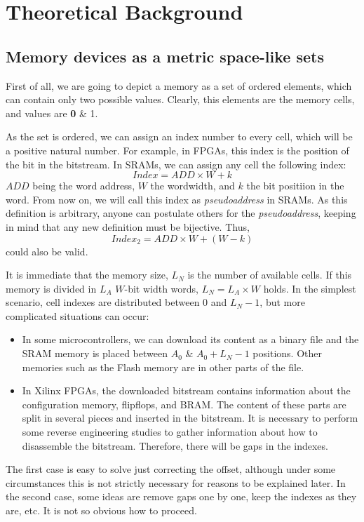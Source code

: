 \chapter{Theoretical Background}
\section{Memory devices as a metric space-like sets}
First of all, we are going to depict a memory as a set of ordered elements, which can contain only two possible values. Clearly, this elements are the memory cells, and values are \textbf{0} \& 1.

As the set is ordered, we can assign an index number to every cell, which will be a positive natural number. For example, in FPGAs, this index is the position of the bit in the bitstream. In SRAMs, we can assign any cell the following index:
%
\begin{equation}
	Index = ADD\times W + k
	\label{Eq:PseudoAddressDefinition}
\end{equation}
%
\(ADD\) being the word address, \(W\) the wordwidth, and \(k\) the bit positiion in the word. From now on, we will call this index as \textit{pseudoaddress} in SRAMs. As this definition is arbitrary, anyone can postulate others for the \textit{pseudoaddress}, keeping in mind that any new definition  must be bijective. Thus, 
\[
	Index_2 = ADD\times W + (W-k)
\]
could also be valid.

It is immediate that the memory size, \(L_N\) is the number of available cells. If this memory is divided in \(L_A\) \(W\)-bit width words, \(L_N = L_A\times W\) holds.  In the simplest scenario, cell indexes are distributed between \(0\) and \(L_N-1\),  but more complicated situations can occur:
%
\begin{itemize}
	\item In some microcontrollers, we can download its content as a binary file and the SRAM memory is placed between \(A_0\) \& \(A_0+L_N-1\) positions. Other memories such as the Flash memory are in other parts of the file.
	\item In Xilinx FPGAs, the downloaded bitstream contains information about the configuration memory, flipflops, and BRAM. The content of these parts are split in several pieces and inserted in the bitstream. It is necessary to perform some reverse engineering studies to gather information about how to disassemble the bitstream. Therefore, there will be gaps in the indexes.
\end{itemize}
%
The first case is easy to solve just correcting the offset, although under some circumstances this is not strictly necessary for reasons to be explained later. In the second case, some ideas are remove gaps one by one, keep the indexes as they are, etc. It is not so obvious how to proceed. 

